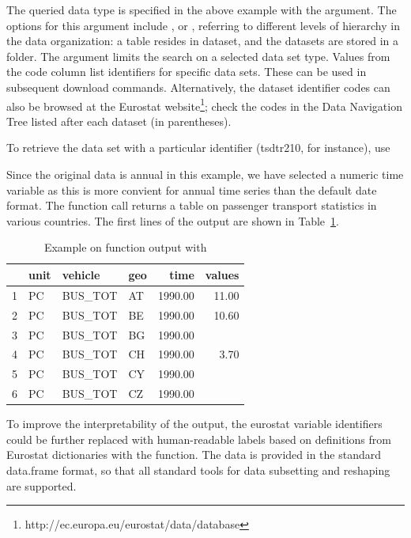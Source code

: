 The queried data type is specified in the above example with
the  argument. The options for this argument
include ,  or , referring to
different levels of hierarchy in the data organization: a table
resides in dataset, and the datasets are stored in a
folder. The  argument limits the search on a selected data
set type. Values from the code column list identifiers for specific
data sets. These can be used in subsequent download
commands. Alternatively, the dataset identifier codes can also be
browsed at the Eurostat
website\footnote{http://ec.europa.eu/eurostat/data/database}; check
the codes in the Data Navigation Tree listed after each dataset (in
parentheses).

To retrieve the data set with a particular identifier (tsdtr210, for
instance), use


Since the original data is annual in this example, we have selected a
numeric time variable as this is more convient for annual time series
than the default date format. The function call returns a table on
passenger transport statistics in various countries. The first lines
of the output are shown in Table~\ref{tab:getdatatable}.

\begin{table}[ht]
\centering
\begin{tabular}{rlllrr}
\toprule
  \hline
 & unit & vehicle & geo & time & values \\ 
  \hline
  1 & PC & BUS\_TOT & AT & 1990.00 & 11.00 \\ 
  2 & PC & BUS\_TOT & BE & 1990.00 & 10.60 \\ 
  3 & PC & BUS\_TOT & BG & 1990.00 &  \\ 
  4 & PC & BUS\_TOT & CH & 1990.00 & 3.70 \\ 
  5 & PC & BUS\_TOT & CY & 1990.00 &  \\ 
  6 & PC & BUS\_TOT & CZ & 1990.00 &  \\ 
   \hline
\bottomrule   
\end{tabular}
\caption{Example on  function output with } 
\label{tab:getdatatable}
\end{table}

To improve the interpretability of the output, the eurostat variable
identifiers could be further replaced with human-readable labels based
on definitions from Eurostat dictionaries with
the  function. The data is provided in the
standard data.frame format, so that all standard tools for data
subsetting and reshaping are supported.



